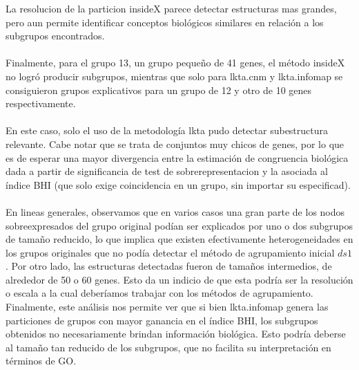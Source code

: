 La resolucion de la particion insideX parece detectar estructuras mas grandes, pero aun permite identificar conceptos biológicos similares en relación a los subgrupos encontrados.\\\\
Finalmente, para el grupo 13, un grupo pequeño de 41 genes, el método insideX no logró producir subgrupos, mientras que solo para lkta.cnm y lkta.infomap se consiguieron grupos explicativos para un grupo de 12 y otro de 10 genes respectivamente.\\\\
En este caso, solo el uso de la metodología lkta pudo detectar subestructura relevante. Cabe notar que se trata de conjuntos muy chicos de genes, por lo que es de esperar una mayor divergencia entre la estimación de congruencia biológica dada a partir de significancia de test de sobrerepresentacion y la asociada al índice BHI (que solo exige coincidencia en un grupo, sin importar su especificad).\\\\
En lineas generales, observamos que en varios casos una gran parte de los nodos sobreexpresados del grupo original podían ser explicados por uno o dos subgrupos de tamaño reducido, lo que implica que existen efectivamente heterogeneidades en los grupos originales que no podía detectar el método de agrupamiento inicial $ds1$. Por otro lado, las estructuras detectadas fueron de tamaños intermedios, de alrededor de 50 o 60 genes. Esto da un indicio de que esta podría ser la resolución o escala a la cual deberíamos trabajar con los métodos de agrupamiento. Finalmente, este análisis nos permite ver que si bien lkta.infomap genera las particiones de grupos con mayor ganancia en el índice BHI, los subgrupos obtenidos no necesariamente brindan información biológica. Esto podría deberse al tamaño tan reducido de los subgrupos, que no facilita su interpretación en términos de GO.




